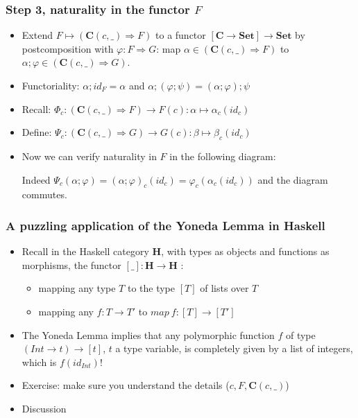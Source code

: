 \documentclass[handout]{beamer}
\newcommand{\To}{\Rightarrow}
\newcommand{\bfsf}[1]{{\boldsymbol{#1}}}
\newcommand{\Set}{\bfsf{Set}}
\newcommand{\CC}{\bfsf{C}}
\newcommand{\HH}{\bfsf{H}}
\begin{document}
\frame
  {   
    \frametitle{Step 3, naturality in the functor $F$}\label{Yon:natural_in_F}

 \begin{itemize}[<+->]
\item Extend $F\mapsto(\CC(c,\_)\To F)$ to a functor $[\CC\to\Set]\to\Set$
by postcomposition with $\varphi:F\To G$: map $\alpha\in(\CC(c,\_)\To F)$
to $\alpha;\varphi\in(\CC(c,\_)\To G)$.
\item Functoriality: 
$\alpha;id_F = \alpha$ and $\alpha;(\varphi;\psi) = (\alpha;\varphi);\psi$
\item Recall: $\Phi_c : (\CC(c,\_)\To F) \to F(c): \alpha\mapsto \alpha_c(id_c)$
\item Define: $\Psi_c : (\CC(c,\_)\To G) \to G(c): \beta\mapsto \beta_c(id_c)$
\item Now we can verify naturality in $F$ in the following diagram:

Indeed $\Psi_c(\alpha;\varphi) = (\alpha;\varphi)_c(id_c) = \varphi_c(\alpha_c(id_c))$
and the diagram commutes.
 \end{itemize}

 }

\frame
  {   
    \frametitle{A puzzling application of the Yoneda Lemma in Haskell}\label{Yon:Hask}

 \begin{itemize}[<+->]
\item Recall in the Haskell category $\HH$, with types as objects and 
functions as morphisms, the functor $[\_]:\HH\to\HH$ :
   \begin{itemize}[<+->]
\item mapping any type $T$ to the type $[T]$ of lists over $T$
\item mapping any $f: T\to T'$ to $map~f: [T] \to [T']$
   \end{itemize}
\item The Yoneda Lemma implies that any polymorphic function
$f$ of type $(Int\to t) \to [t]$, $t$ a type variable,
is completely given by a list of integers, which is $f(id_{Int})$!
\item Exercise: make sure you understand the details ($c,F,\CC(c,\_)$) %
\item Discussion
 \end{itemize}

 }
\end{document}
